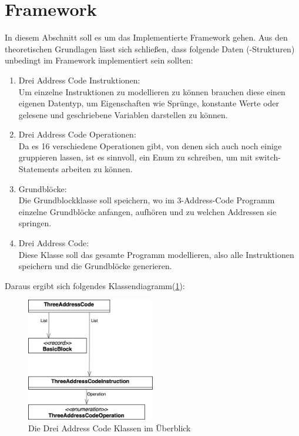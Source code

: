 \section{Framework}
In diesem Abschnitt soll es um das Implementierte Framework gehen.
Aus den theoretischen Grundlagen lässt sich schließen, dass 
folgende Daten (-Strukturen) unbedingt im Framework implementiert sein sollten:

\begin{enumerate} \label{tac}
  \item Drei Address Code Instruktionen:\\ 
    Um einzelne Instruktionen zu modellieren zu können brauchen diese einen
    eigenen Datentyp, um Eigenschaften wie Sprünge, konstante Werte oder
    gelesene und geschriebene Variablen darstellen zu können.
  \item Drei Address Code Operationen:\\
    Da es 16 verschiedene Operationen gibt, von denen sich auch noch einige
    gruppieren lassen, ist es sinnvoll, ein Enum zu schreiben, um mit 
    switch-Statements arbeiten zu können.
  \item Grundblöcke:\\ 
    Die Grundblockklasse soll speichern, wo im 3-Address-Code Programm
    einzelne Grundblöcke anfangen, aufhören und zu welchen Addressen sie springen.
  \item Drei Address Code: \\ 
    Diese Klasse soll das gesamte Programm modellieren, also alle Instruktionen
    speichern und die Grundblöcke generieren.
\end{enumerate}
Daraus ergibt sich folgendes Klassendiagramm(\cref{fig:3AC-classes}):
\begin{figure}[h]
  \centering
  \includegraphics[width=0.5\textwidth]{fig/3AC_classes.png}
  \caption{Die Drei Address Code Klassen im Überblick}%
  \label{fig:3AC-classes}
\end{figure}


